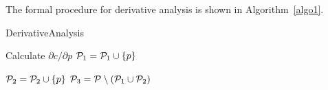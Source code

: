  \noindent
The formal procedure for derivative analysis is shown in Algorithm~\ref{algo1}.


\begin{algorithm}[!htb]
  \caption{DerivativeAnalysis}

  \begin{algorithmic}[1]
    \State Calculate $\partial{c}/\partial{p}$
      \State ${\cal{P}}_1 = {\cal{P}}_1 \cup \{p\}$ 
          
    \EndIf
  \EndFor
      \State ${\cal{P}}_2 = {\cal{P}}_2 \cup \{p\}$
  \EndIf
\EndFor
\State ${\cal{P}}_3 = {\cal{P}} \setminus ({\cal{P}}_1 \cup {\cal{P}}_2)$      
  \end{algorithmic}
  \label{algo1}
\end{algorithm}




\begin{comment}

 \begin{boxedalgorithmic}%
 \Procedure{DerivativeAnalysis} {${\cal{P}}, {\cal{C}}$}\\
{ Input:  (${\cal{P}}=\{p_1,p_2,\ldots,p_m\}, {\cal{C}}=\{{\cal{C}}_1,{\cal{C}}_2,\ldots,{\cal{C}}_k\}$)}\\
{ Output: (${\cal{P}}_1, {\cal{P}}_2, {\cal{P}}_3$)}
\For{$p \in {\cal{P}}$}
  \For{$c \in {\cal{C}}$}
    \State Calculate $\partial{c}/\partial{p}$
    \If{$\partial{c}/\partial{p} = 1$} %
      \State ${\cal{P}}_1 = {\cal{P}}_1 \cup \{p\}$ 
          
    \EndIf
  \EndFor
  \If{$\partial{c}/\partial{p} = 0,\text{ } \forall c \in {\cal{C}}$}  \\
      \Comment{\emph{Useless for all rules}}
      \State ${\cal{P}}_2 = {\cal{P}}_2 \cup \{p\}$
  \EndIf
\EndFor
\State ${\cal{P}}_3 = {\cal{P}} \setminus ({\cal{P}}_1 \cup {\cal{P}}_2)$      
\EndProcedure

\end{boxedalgorithmic}

\label{algo1}
\end{comment}

